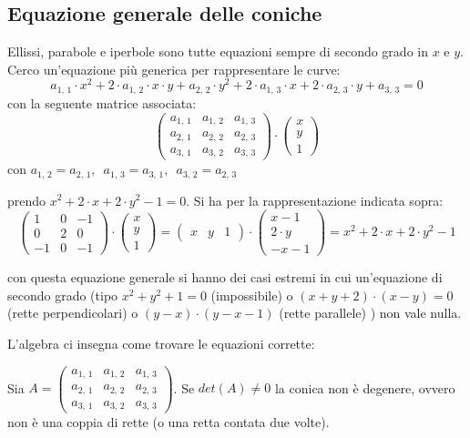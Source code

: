 \documentclass[a4paper,12pt, oneside]{book}
\begin{document}
\subsection{Equazione generale delle coniche}
Ellissi, parabole e iperbole sono tutte equazioni sempre di secondo grado in $x$ e $y$. Cerco un'equazione più generica per rappresentare le curve:
$$a_{1,\,1}\cdot x^2+2\cdot a_{1,\,2}\cdot x\cdot y+a_{2,\,2}\cdot y^2+2\cdot a_{1,\,3}\cdot x+2\cdot a_{2,\,3}\cdot y+a_{3,\,3}=0$$
con la seguente matrice associata:
$$
	\left(\begin{matrix}
			a_{1,\,1} & a_{1,\,2} & a_{1,\,3} \\
			a_{2,\,1} & a_{2,\,2} & a_{2,\,3} \\
			a_{3,\,1} & a_{3,\,2} & a_{3,\,3}
		\end{matrix}\right)\cdot
	\left(\begin{matrix}
			x \\
			y \\
			1
		\end{matrix}\right)
$$
con $a_{1,\,2}=a_{2,\,1},\,\,\, a_{1,\,3}=a_{3,\,1},\,\,\,a_{3,\,2}=a_{2,\,3}$
\begin{esempio}
	prendo $x^2+2\cdot x+2\cdot y^2-1=0$. Si ha per la rappresentazione indicata sopra:
	$$
		\left(\begin{matrix}
			1  & 0 & -1 \\
			0  & 2 & 0  \\
			-1 & 0 & -1
		\end{matrix}\right)\cdot
		\left(\begin{matrix}
			x \\
			y \\
			1
		\end{matrix}\right)=\left(\begin{matrix}
			x & y & 1
		\end{matrix}\right)\cdot\left(\begin{matrix}
			x-1      \\
			2\cdot y \\
			-x-1
		\end{matrix}\right)=x^2+2\cdot x+2\cdot y^2-1
	$$
\end{esempio}

con questa equazione generale si hanno dei casi estremi in cui un'equazione di secondo grado (tipo $x^2+y^2+1=0$ (impossibile) o $(x+y+2)\cdot(x-y)=0$ (rette perpendicolari) o $(y-x)\cdot (y-x-1)$ (rette parallele) ) non vale nulla.
\newpage

L'algebra ci insegna come trovare le equazioni corrette:
\begin{teorema} 
	Sia $A=
		\left(\begin{matrix}
				a_{1,\,1} & a_{1,\,2} & a_{1,\,3} \\
				a_{2,\,1} & a_{2,\,2} & a_{2,\,3} \\
				a_{3,\,1} & a_{3,\,2} & a_{3,\,3}
			\end{matrix}\right)$. Se $det(A)\neq 0$ la conica non è degenere, ovvero non è una coppia di rette (o una retta contata due volte).
\end{teorema}
\end{document}
